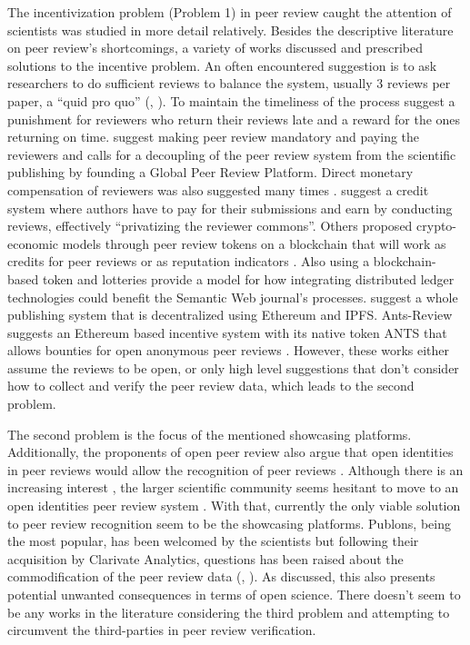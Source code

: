 The incentivization problem (Problem 1) in peer review caught the attention of scientists was studied in more detail relatively. Besides the descriptive literature on peer review’s shortcomings, a variety of works discussed and prescribed solutions to the incentive problem. An often encountered suggestion is to ask researchers to do sufficient reviews to balance the system, usually 3 reviews per paper, a “quid pro quo” (\cite{Derraik.2015}, \cite[5201]{Grainger.2007}). To maintain the timeliness of the process \cite{Hauser.2007} suggest a punishment for reviewers who return their reviews late and a reward for the ones returning on time. \cite{Ferreira.2016} suggest making peer review mandatory and paying the reviewers and calls for a decoupling of the peer review system from the scientific publishing by founding a Global Peer Review Platform. Direct monetary compensation of reviewers was also suggested many times \parencite{Prufer.2010}. \cite{Fox.2010} suggest a credit system where authors have to pay for their submissions and earn by conducting reviews, effectively “privatizing the reviewer commons”. Others proposed crypto-economic models through peer review tokens on a blockchain that will work as credits for peer reviews or as reputation indicators \parencite{Avital.2018, Jan.2018c, Spearpoint.2017, Tarkhanov.2020}. Also using a blockchain-based token and lotteries \cite{Janowicz.2018} provide a model for how integrating distributed ledger technologies could benefit the Semantic Web journal’s processes. \cite{TenorioFornes.2019} suggest a whole publishing system that is decentralized using Ethereum and IPFS. Ants-Review suggests an Ethereum based incentive system with its native token ANTS that allows bounties for open anonymous peer reviews \parencite{TrovoMassari}. However, these works either assume the reviews to be open, or only high level suggestions that don't consider how to collect and verify the peer review data, which leads to the second problem.

The second problem is the focus of the mentioned showcasing platforms. Additionally, the proponents of open peer review also argue that open identities in peer reviews would allow the recognition of peer reviews \parencite[3]{RossHellauer.2017b}. Although there is an increasing interest \parencite{Wolfram.2020}, the larger scientific community seems hesitant to move to an open identities peer review system \parencite{RossHellauer.2017b, Ware.2008, Taylor&Francis.2015}. With that, currently the only viable solution to peer review recognition seem to be the showcasing platforms. Publons, being the most popular, has been welcomed by the scientists but following their acquisition by Clarivate Analytics, questions has been raised about the commodification of the peer review data (\cite[14]{Tennant.2017}, \cite{TeixeiradaSilva.2019}). As discussed, this also presents potential unwanted consequences in terms of open science. There doesn't seem to be any works in the literature considering the third problem and attempting to circumvent the third-parties in peer review verification. 

